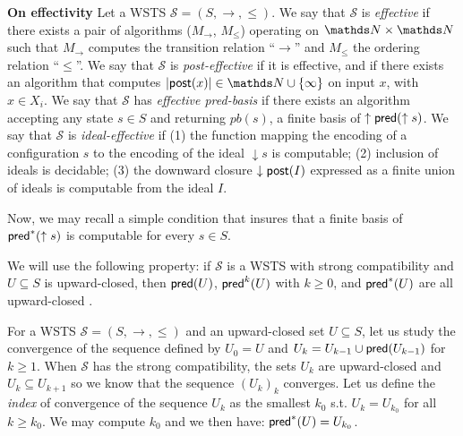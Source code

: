 \noindent
{\bf On effectivity}
Let a WSTS $\mathscr{S}=(S, \rightarrow, \leq)$. We say that $\mathscr{S}$ is {\em effective} if there exists a pair of algorithms
($M_\rightarrow$, $M_\leq$) operating on $\N \times \N$ such that
$ M_\rightarrow$ computes the transition relation “$\rightarrow$” and 
$M_\leq$ the ordering relation “$\leq$”.
We say that $\mathscr{S}$ is {\em post-effective} if it is effective, and if there
exists an algorithm that computes $|\post(x)| \in \N \cup \{\infty\}$ 
on input $x$, with $x \in X_i $. 
We say that $\mathscr{S}$ has {\em effective pred-basis} \cite{DBLP:journals/tcs/FinkelS01,DBLP:journals/iandc/AbdullaCJT00} if there exists an algorithm accepting
any state $s \in S$ and returning $pb(s)$, a finite basis of $\uparrow \textsf{pred}(\uparrow s)$.
%
We say that $\mathscr{S}$
is {\em ideal-effective} \cite{BFM-ic17} if (1) the function mapping the encoding of a configuration $s$
to the encoding of the ideal $\downarrow s$ is computable; (2) inclusion of ideals is decidable; (3) the downward closure $\downarrow \textsf{post}(I)$ expressed as a finite union of ideals is computable from the ideal $I$.

\iffalse
Proof. Assume $s \in \pred (I )$. Then $s \rightarrow t$ for some $t \in I $. If now $s' \geq s$ then strong upward-compatibility entails that $s' \rightarrow t'$ for some $t' \geq t$. Then $t' \in I$ and $s' \in \pred(I )$.
\fi

Now, we may recall a simple condition that insures that a finite basis of $\textsf{pred}^*(\uparrow s )$ is computable for every $s \in S$.


We will use the following property: if $\mathscr{S}$ is a WSTS with strong compatibility and $U \subseteq S$ is upward-closed, then $\textsf{pred}(U )$, $\textsf{pred}^k(U )$ with $k\geq0$, and $\textsf{pred}^*(U )$ are all upward-closed \cite{DBLP:journals/tcs/FinkelS01}.

For a WSTS $\mathscr{S}=(S, \rightarrow, \leq)$ and an upward-closed set $U  \subseteq S$, let us study the convergence of the sequence defined by $U_0=U$ and $U_k= U_{k-1} \cup \textsf{pred}(U_{k-1})$ for $k \geq 1$. When $\mathscr{S}$ has the strong compatibility, the sets $U_k$ are upward-closed and $U_k \subseteq U_{k+1}$ so we know that the sequence $(U_k)_k$ converges. Let us define the \emph{index} of convergence of the sequence $U_k$ as the smallest $k_0$ s.t. $U_k = U_{k_0}$ for all $k \geq k_0$. We may compute $k_0$ and we then have:  $\textsf{pred}^*(U) = U_{k_0}$. \\

